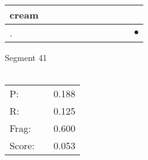 \documentclass[landscape]{article}
\newcommand{\ssp}{\hspace{2pt}}
\newcommand{\mex}{\cellcolor{g}$\bullet$}
\begin{document}
\begin{tabular}{|l|p{10pt}|p{10pt}|p{10pt}|p{10pt}|p{10pt}|p{10pt}|p{10pt}|p{10pt}|p{10pt}|p{10pt}|}
\hline
\ssp cream \ssp&\hspace{2pt}&\hspace{2pt}&\hspace{2pt}&\hspace{2pt}&\hspace{2pt}&\hspace{2pt}&\hspace{2pt}&\hspace{2pt}&\hspace{2pt}&\hspace{2pt}\\
\hline
\ssp \cellcolor{ref9}. \ssp&\hspace{2pt}&\hspace{2pt}&\hspace{2pt}&\hspace{2pt}&\hspace{2pt}&\hspace{2pt}&\hspace{2pt}&\hspace{2pt}&\hspace{2pt}&\hspace{2pt}\mex\\
\hline
\end{tabular}

\vspace{6pt}
\noindent Segment 41\\\\
\noindent\begin{tabular}{lm{12pt}r}
\hline
P:&&0.188\\
R:&&0.125\\
Frag:&&0.600\\
Score:&&0.053\\
\end{tabular}

\newpage
\end{document}
